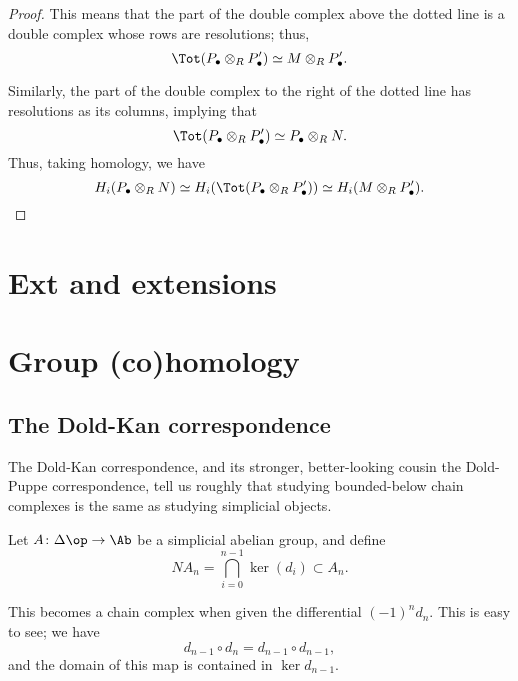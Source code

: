 \documentclass[main.tex]{subfiles}
\begin{document}
\begin{proof}
  This means that the part of the double complex above the dotted line is a double complex whose rows are resolutions; thus,
  \begin{equation*}
    \Tot(P_{\bullet} \otimes_{R} P'_{\bullet}) \simeq M \otimes_{R} P'_{\bullet}.
  \end{equation*}

  Similarly, the part of the double complex to the right of the dotted line has resolutions as its columns, implying that
  \begin{equation*}
    \Tot(P_{\bullet} \otimes_{R} P'_{\bullet}) \simeq P_{\bullet} \otimes_{R} N.
  \end{equation*}
  Thus, taking homology, we have
  \begin{equation*}
    H_{i}(P_{\bullet} \otimes_{R} N) \simeq H_{i}(\Tot(P_{\bullet} \otimes_{R} P'_{\bullet})) \simeq H_{i} (M \otimes_{R} P'_{\bullet}).
  \end{equation*}
\end{proof}


\section{Ext and extensions}
\label{sec:ext_and_extensions}

\section{Group (co)homology}
\label{sec:group_co_homology}

\subsection{The Dold-Kan correspondence}
\label{ssc:the_dold_kan_correspondence}

The Dold-Kan correspondence, and its stronger, better-looking cousin the Dold-Puppe correspondence, tell us roughly that studying bounded-below chain complexes is the same as studying simplicial objects.

Let $A\colon \Delta\op \to \Ab$ be a simplicial abelian group, and define
\begin{equation*}
  NA_{n} = \bigcap_{i = 0}^{n-1} \ker(d_{i}) \subset A_{n}.
\end{equation*}

This becomes a chain complex when given the differential $(-1)^{n}d_{n}$. This is easy to see; we have
\begin{equation*}
  d_{n-1} \circ d_{n} = d_{n-1} \circ d_{n-1},
\end{equation*}
and the domain of this map is contained in $\ker d_{n-1}$.
\end{document}
